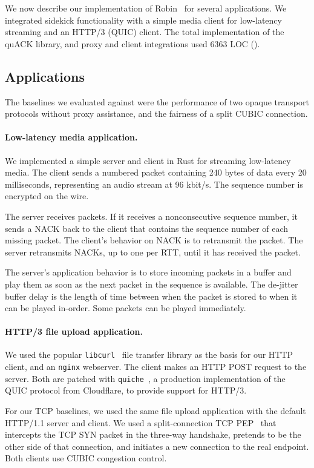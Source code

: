 We now describe our implementation of Robin~\cite{sidekick-github} for several applications.
We integrated sidekick functionality with a simple media client for low-latency streaming
and an HTTP/3 (QUIC) client.
The total implementation of the quACK library, and proxy and client
integrations used 6363 LOC ().

\subsection{Applications}

The baselines we evaluated against were the performance of two opaque transport
protocols without proxy assistance, and the fairness of a split CUBIC connection.

\paragraph{Low-latency media application.}
We implemented a simple server and client in Rust for streaming low-latency
media. The client sends a numbered packet containing 240 bytes of data every
20 milliseconds, representing an audio stream at 96 kbit/s.
The sequence number is encrypted on the wire.

The server receives packets. If it receives a nonconsecutive sequence number,
it sends a NACK back to the client that contains the sequence number of each
missing packet. The client's behavior on NACK is to retransmit the packet. The
server retransmits NACKs, up to one per RTT, until it has received the packet.

The server's application behavior is to store incoming packets in a buffer
and play them as soon as the next packet in the sequence is available. The
de-jitter buffer delay is the length of time between when the packet is stored
to when it can be played in-order. Some packets can be played immediately.

\paragraph{HTTP/3 file upload application.}
We used the popular \texttt{libcurl}~\cite{libcurl} file transfer library as the basis for
our HTTP client, and an \texttt{nginx} webserver. The client makes an HTTP
POST request to the server. Both are patched with \texttt{quiche}~\cite{quiche}, a production
implementation of the QUIC protocol from Cloudflare, to provide support for
HTTP/3.

For our TCP baselines, we used the same file upload application with the
default HTTP/1.1 server and client. We used a split-connection
TCP PEP~\cite{caini2006pepsal} that intercepts the TCP
SYN packet in the three-way handshake, pretends to be the other side of that
connection, and initiates a new connection to the real endpoint.
Both clients use CUBIC congestion control.

